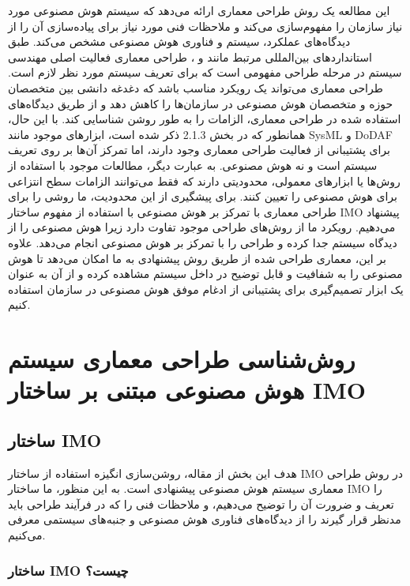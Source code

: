 \documentclass[a4paper,10pt]{article}
\begin{document}
            این مطالعه یک روش طراحی معماری ارائه می‌دهد که سیستم هوش مصنوعی مورد نیاز سازمان را مفهوم‌سازی می‌کند و ملاحظات فنی مورد نیاز برای پیاده‌سازی آن را از دیدگاه‌های عملکرد، سیستم و فناوری هوش مصنوعی مشخص می‌کند. طبق استانداردهای بین‌المللی مرتبط مانند  و ، طراحی معماری فعالیت اصلی مهندسی سیستم در مرحله طراحی مفهومی است که برای تعریف سیستم مورد نظر لازم است. طراحی معماری می‌تواند یک رویکرد مناسب باشد که دغدغه دانشی بین متخصصان حوزه و متخصصان هوش مصنوعی در سازمان‌ها را کاهش دهد و از طریق دیدگاه‌های استفاده شده در طراحی معماری، الزامات را به طور روشن شناسایی کند. با این حال، همانطور که در بخش 2.1.3 ذکر شده است، ابزارهای موجود مانند SysML و DoDAF برای پشتیبانی از فعالیت طراحی معماری وجود دارند، اما تمرکز آن‌ها بر روی تعریف سیستم است و نه هوش مصنوعی. به عبارت دیگر، مطالعات موجود با استفاده از روش‌ها یا ابزارهای معمولی، محدودیتی دارند که فقط می‌توانند الزامات سطح انتزاعی برای هوش مصنوعی را تعیین کنند. برای پیشگیری از این محدودیت، ما روشی را برای طراحی معماری با تمرکز بر هوش مصنوعی با استفاده از مفهوم ساختار IMO پیشنهاد می‌دهیم. رویکرد ما از روش‌های طراحی موجود تفاوت دارد زیرا هوش مصنوعی را از دیدگاه سیستم جدا کرده و طراحی را با تمرکز بر هوش مصنوعی انجام می‌دهد. علاوه بر این، معماری طراحی شده از طریق روش پیشنهادی به ما امکان می‌دهد تا هوش مصنوعی را به شفافیت و قابل توضیح در داخل سیستم مشاهده کرده و از آن به عنوان یک ابزار تصمیم‌گیری برای پشتیبانی از ادغام موفق هوش مصنوعی در سازمان استفاده کنیم.

    \section{روش‌شناسی طراحی معماری سیستم هوش مصنوعی مبتنی بر ساختار IMO}

        \subsection{ساختار IMO}

            هدف این بخش از مقاله، روشن‌سازی انگیزه استفاده از ساختار IMO در روش طراحی معماری سیستم هوش مصنوعی پیشنهادی است. به این منظور، ما ساختار IMO را تعریف و ضرورت آن را توضیح می‌دهیم، و ملاحظات فنی را که در فرآیند طراحی باید مدنظر قرار گیرند را از دیدگاه‌های فناوری هوش مصنوعی و جنبه‌های سیستمی معرفی می‌کنیم.

            \subsubsection{ساختار IMO چیست؟}
\end{document}
